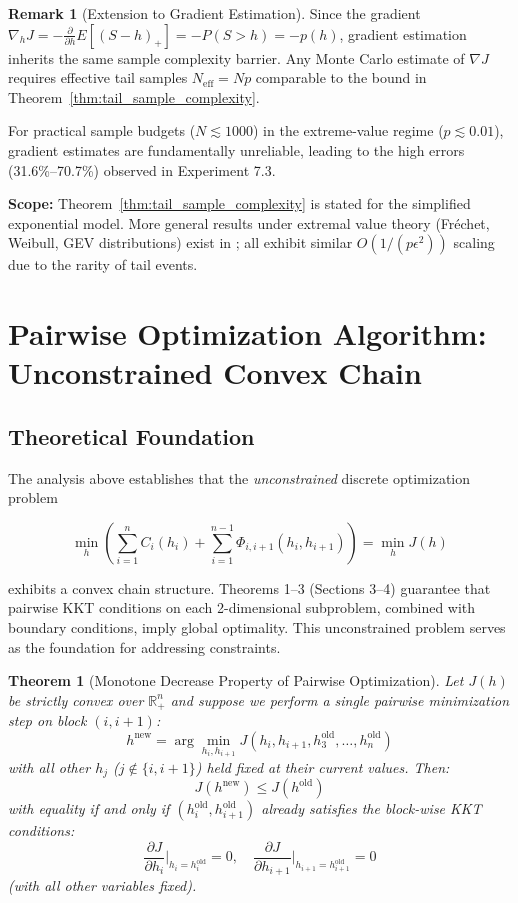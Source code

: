 \documentclass[12pt]{article}
\newtheorem{theorem}{Theorem}[section]
\theoremstyle{definition}
\newtheorem{remark}{Remark}[section]
\begin{document}
\begin{remark}[Extension to Gradient Estimation]
Since the gradient $\nabla_h J = -\frac{\partial}{\partial h} E[(S - h)_+] = -P(S > h) = -p(h)$, gradient estimation inherits the same sample complexity barrier. Any Monte Carlo estimate of $\nabla J$ requires effective tail samples $N_{\text{eff}} = Np$ comparable to the bound in Theorem~\ref{thm:tail_sample_complexity}.

For practical sample budgets ($N \lesssim 1000$) in the extreme-value regime ($p \lesssim 0.01$), gradient estimates are fundamentally unreliable, leading to the high errors (31.6\%--70.7\%) observed in Experiment 7.3.

\noindent\textbf{Scope:} Theorem~\ref{thm:tail_sample_complexity} is stated for the simplified exponential model. More general results under extremal value theory (Fréchet, Weibull, GEV distributions) exist in \cite{DeHaan:ExtremeValue}; all exhibit similar $O(1/(p\epsilon^2))$ scaling due to the rarity of tail events.
\end{remark}

\section{Pairwise Optimization Algorithm: Unconstrained Convex Chain}

\subsection*{Theoretical Foundation}

The analysis above establishes that the \emph{unconstrained} discrete optimization problem

\[
\min_h \left( \sum_{i=1}^n C_i(h_i) + \sum_{i=1}^{n-1} \Phi_{i,i+1}(h_i, h_{i+1}) \right) = \min_h J(h)
\]

exhibits a convex chain structure. Theorems 1--3 (Sections 3--4) guarantee that pairwise KKT conditions on each 2-dimensional subproblem, combined with boundary conditions, imply global optimality. This unconstrained problem serves as the foundation for addressing constraints.

\begin{theorem}[Monotone Decrease Property of Pairwise Optimization]
\label{thm:monotone_decrease}
Let $J(h)$ be strictly convex over $\mathbb{R}^n_+$ and suppose we perform a single pairwise minimization step on block $(i, i+1)$:
\[
h^{\text{new}} = \arg\min_{h_i, h_{i+1}} J(h_i, h_{i+1}, h_3^{\text{old}}, \ldots, h_n^{\text{old}})
\]
with all other $h_j$ ($j \notin \{i, i+1\}$) held fixed at their current values. Then:
\[
J(h^{\text{new}}) \leq J(h^{\text{old}})
\]
with equality if and only if $(h_i^{\text{old}}, h_{i+1}^{\text{old}})$ already satisfies the block-wise KKT conditions:
\[
\frac{\partial J}{\partial h_i}\bigg|_{h_i=h_i^{\text{old}}} = 0, \quad \frac{\partial J}{\partial h_{i+1}}\bigg|_{h_{i+1}=h_{i+1}^{\text{old}}} = 0
\]
(with all other variables fixed).
\end{theorem}
\end{document}

